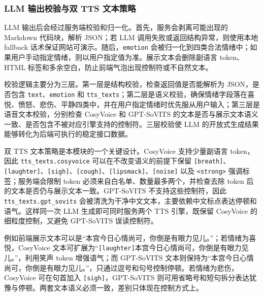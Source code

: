 \documentclass[12pt,a4paper]{article}
\begin{document}
\subsubsection{LLM 输出校验与双 TTS 文本策略}

LLM 输出后会经过服务端校验和归一化。首先，服务会剥离可能出现的 Markdown 代码块，解析 JSON；若 LLM 调用失败或返回结构异常，则使用本地 fallback 话术保证网站可演示。随后，\texttt{emotion} 会被归一化到四类合法情绪中；如果用户手动指定情绪，则以用户指定值为准。展示文本会删除副语言 token、HTML 标签和多余空白，防止前端气泡出现控制符或不自然文本。

校验逻辑主要分为三层。第一层是结构校验，检查返回值是否能解析为 JSON，是否包含 \texttt{text}、\texttt{emotion} 和 \texttt{tts\_texts}；第二层是语义校验，确保情绪字段落在喜悦、愤怒、悲伤、平静四类中，并在用户指定情绪时优先服从用户输入；第三层是语音文本校验，分别检查 CosyVoice 和 GPT-SoVITS 的文本是否与展示文本语义一致、是否包含不被对应引擎支持的控制符。三层校验使 LLM 的开放式生成结果能够转化为后端可执行的稳定接口数据。

双 TTS 文本策略是本模块的一个关键设计。CosyVoice 支持少量副语言 token，因此 \texttt{tts\_texts.cosyvoice} 可以在不改变语义的前提下保留 \texttt{[breath]}、\texttt{[laughter]}、\texttt{[sigh]}、\texttt{[cough]}、\texttt{[lipsmack]}、\texttt{[noise]} 以及 \texttt{<strong>} 强调标签；服务端会限制 token 必须来自白名单、数量最多两个，并检查去除 token 后的文本是否仍与展示文本一致。GPT-SoVITS 不支持这些控制符，因此 \texttt{tts\_texts.gpt\_sovits} 会被清洗为干净中文文本，主要依赖中文标点表达停顿和语气。这样同一次 LLM 生成即可同时服务两个 TTS 引擎，既保留 CosyVoice 的细粒度控制，又避免 GPT-SoVITS 误读控制符。

例如前端展示文本可以是“本宫今日心情尚可，你倒是有眼力见儿。”；若情绪为喜悦，CosyVoice 文本可扩展为“\texttt{[laughter]}本宫今日心情尚可，你倒是有眼力见儿。”，利用笑声 token 增强语气；而 GPT-SoVITS 文本则保持为“本宫今日心情尚可，你倒是有眼力见儿。”，只通过逗号和句号控制停顿。若情绪为悲伤，CosyVoice 可在句首加入 \texttt{[sigh]}，GPT-SoVITS 则可用省略号和短句拆分表达犹豫与停顿。两套文本语义必须一致，差别只体现在控制方式上。
\end{document}
